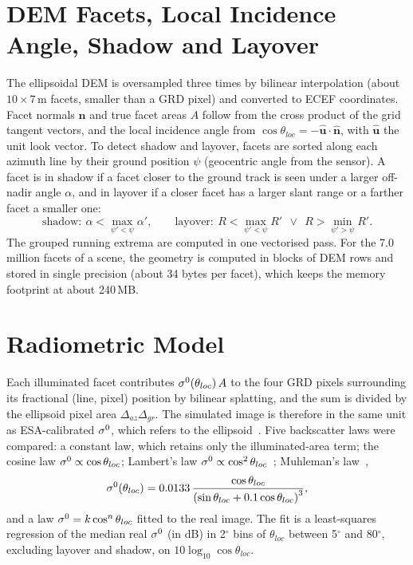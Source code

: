 \section{DEM Facets, Local Incidence Angle, Shadow and Layover}
The ellipsoidal DEM is oversampled three times by bilinear interpolation (about $10\times7$\,m facets, smaller than a GRD pixel) and converted to ECEF coordinates. Facet normals $\hat{\mathbf{n}}$ and true facet areas $A$ follow from the cross product of the grid tangent vectors, and the local incidence angle from $\cos\theta_{loc}=-\hat{\mathbf{u}}\cdot\hat{\mathbf{n}}$, with $\hat{\mathbf{u}}$ the unit look vector. To detect shadow and layover, facets are sorted along each azimuth line by their ground position $\psi$ (geocentric angle from the sensor). A facet is in shadow if a facet closer to the ground track is seen under a larger off-nadir angle $\alpha$, and in layover if a closer facet has a larger slant range or a farther facet a smaller one:
\begin{equation}
\mathrm{shadow}:\ \alpha<\max_{\psi'<\psi}\alpha',\qquad \mathrm{layover}:\ R<\max_{\psi'<\psi}R' \ \ \lor\ \ R>\min_{\psi'>\psi}R' .
\end{equation}
The grouped running extrema are computed in one vectorised pass. For the 7.0 million facets of a scene, the geometry is computed in blocks of DEM rows and stored in single precision (about 34 bytes per facet), which keeps the memory footprint at about 240\,MB.

\section{Radiometric Model}
Each illuminated facet contributes $\sigma^0(\theta_{loc})\,A$ to the four GRD pixels surrounding its fractional (line, pixel) position by bilinear splatting, and the sum is divided by the ellipsoid pixel area $\Delta_{az}\Delta_{gr}$. The simulated image is therefore in the same unit as ESA-calibrated $\sigma^0$, which refers to the ellipsoid~\cite{small2011}. Five backscatter laws were compared: a constant law, which retains only the illuminated-area term; the cosine law $\sigma^0\propto\cos\theta_{loc}$; Lambert's law $\sigma^0\propto\cos^2\theta_{loc}$~\cite{ulaby1982}; Muhleman's law~\cite{muhleman1964},
\begin{equation}
\sigma^0(\theta_{loc})=0.0133\,\frac{\cos\theta_{loc}}{\left(\sin\theta_{loc}+0.1\cos\theta_{loc}\right)^3},
\end{equation}
and a law $\sigma^0=k\cos^{n}\theta_{loc}$ fitted to the real image. The fit is a least-squares regression of the median real $\sigma^0$ (in dB) in 2$^\circ$ bins of $\theta_{loc}$ between 5$^\circ$ and 80$^\circ$, excluding layover and shadow, on $10\log_{10}\cos\theta_{loc}$.

